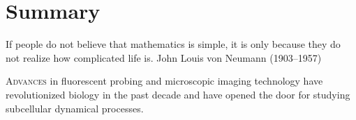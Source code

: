 %
%

\noquote
{}

\chpos{22mm}{12mm}
\chapter{Summary}


\mysquote{\textwidth}
{If people do not believe that mathematics is simple, it is only
  because they do not realize how complicated life is.}
{John Louis von Neumann (1903--1957)}


\lettrine{A}{dvances} in fluorescent probing and microscopic imaging
technology have revolutionized biology in the past decade and have
opened the door for studying subcellular dynamical processes. 




